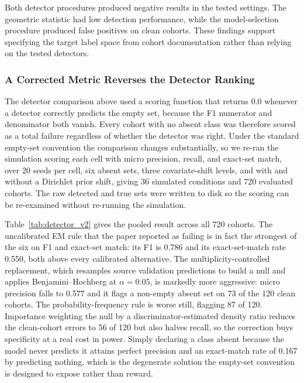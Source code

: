 \documentclass[11pt,a4paper]{article}
\begin{document}
Both detector procedures produced negative results in the tested settings. The geometric statistic
had low detection performance, while the model-selection procedure produced false positives on
clean cohorts. These findings support specifying the target label space from cohort documentation
rather than relying on the tested detectors.

\subsubsection{A Corrected Metric Reverses the Detector Ranking}
\label{sec:detector_v2}

The detector comparison above used a scoring function that returns $0.0$ whenever a detector
correctly predicts the empty set, because the F1 numerator and denominator both vanish. Every
cohort with no absent class was therefore scored as a total failure regardless of whether the
detector was right. Under the standard empty-set convention the comparison changes substantially,
so we re-ran the simulation scoring each cell with micro precision, recall, and exact-set match,
over 20 seeds per cell, six absent sets, three covariate-shift levels, and with and without a
Dirichlet prior shift, giving 36 simulated conditions and 720 evaluated cohorts. The raw detected
and true sets were written to disk so the scoring can be re-examined without re-running the
simulation.

Table~\ref{tab:detector_v2} gives the pooled result across all 720 cohorts. The uncalibrated EM
rule that the paper reported as failing is in fact the strongest of the six on F1 and exact-set
match: its F1 is 0.786 and its exact-set-match rate 0.550, both above every calibrated alternative. The
multiplicity-controlled replacement, which resamples source validation predictions to build a null
and applies Benjamini--Hochberg at $\alpha = 0.05$, is markedly more aggressive: micro precision
falls to 0.577 and it flags a non-empty absent set on 73 of the 120 clean cohorts. The
probability-frequency rule is worse still, flagging 87 of 120. Importance weighting the null by a
discriminator-estimated density ratio reduces the clean-cohort errors to 56 of 120 but also halves
recall, so the correction buys specificity at a real cost in power. Simply declaring a class absent
because the model never predicts it attains perfect precision and an exact-match rate of 0.167 by
predicting nothing, which is the degenerate solution the empty-set convention is designed to expose
rather than reward.
\end{document}
